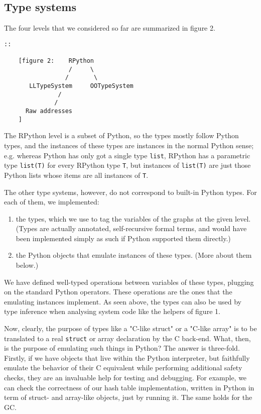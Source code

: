 \documentclass{acm_proc_article-sp}
\begin{document}
\subsection{Type systems}

The four levels that we considered so far are summarized in figure 2.

\begin{verbatim}
::

    [figure 2:    RPython
                  /     \
                 /       \
       LLTypeSystem     OOTypeSystem
               /
              /
      Raw addresses
    ]
\end{verbatim}

The RPython level is a subset of Python, so the types mostly follow
Python types, and the instances of these types are instances in the
normal Python sense; e.g. whereas Python has only got a single type
\texttt{list}, RPython has a parametric type \texttt{list(T)} for every RPython
type \texttt{T}, but instances of \texttt{list(T)} are just those Python lists
whose items are all instances of \texttt{T}.

The other type systems, however, do not correspond to built-in Python
types.  For each of them, we implemented:

\begin{enumerate}
\item the types, which we use to tag the variables of the graphs at
      the given level.  (Types are actually annotated, self-recursive
      formal terms, and would have been implemented simply as such if
      Python supported them directly.)

\item the Python objects that emulate instances of these types.  (More
      about them below.)
\end{enumerate}

We have defined well-typed operations between variables of these types,
plugging on the standard Python operators.  These operations are the
ones that the emulating instances implement.  As seen above, the types
can also be used by type inference when analysing system code like the
helpers of figure 1.

Now, clearly, the purpose of types like a "C-like struct" or a "C-like
array" is to be translated to a real \texttt{struct} or array declaration by
the C back-end.  What, then, is the purpose of emulating such things in
Python?  The answer is three-fold.  Firstly, if we have objects that
live within the Python interpreter, but faithfully emulate the behavior
of their C equivalent while performing additional safety checks, they
are an invaluable help for testing and debugging.  For example, we can
check the correctness of our hash table implementation, written in
Python in term of struct- and array-like objects, just by running it.
The same holds for the GC.
\end{document}

